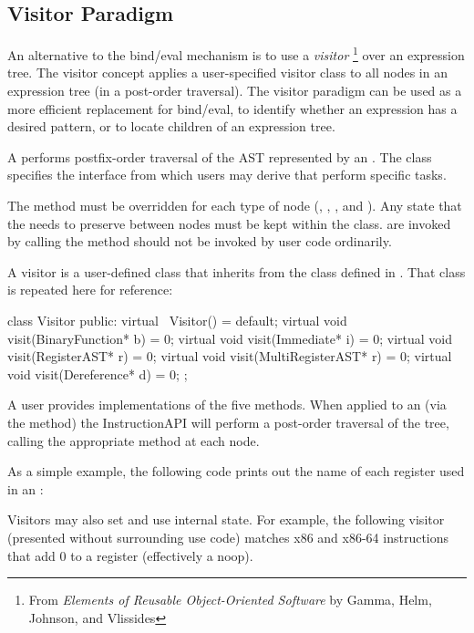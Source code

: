 \subsection{Visitor Paradigm}
\label{sec:visitor}


An alternative to the bind/eval mechanism is to use a \emph{visitor}
\footnote{From \emph{Elements of Reusable Object-Oriented Software} by
  Gamma, Helm, Johnson, and Vlissides}
over an expression tree. The visitor concept applies a user-specified
visitor class to all nodes in an expression tree (in a post-order
traversal). The visitor paradigm can be used as a more efficient
replacement for bind/eval, to identify whether an expression has a
desired pattern, or to locate children of an expression tree.

A  performs postfix-order traversal of the AST represented by
an .  The  class specifies the interface from which
users may derive  that perform specific tasks.

The  method must be overridden for each type of  node
(, , , and ).  Any state that
the  needs to preserve between nodes must be kept within the class.
 are invoked by calling  the  method
should not be invoked by user code ordinarily.

A visitor is a user-defined class that inherits from the
 class defined in . That class is
repeated here for reference:

\begin{apient}
class Visitor {
  public:
    virtual ~Visitor() = default;
    virtual void visit(BinaryFunction* b) = 0;
    virtual void visit(Immediate* i) = 0;
    virtual void visit(RegisterAST* r) = 0;
    virtual void visit(MultiRegisterAST* r) = 0;
    virtual void visit(Dereference* d) = 0;
};
\end{apient}

A user provides implementations of the five  methods. When
applied to an  (via the 
method) the InstructionAPI will perform a post-order traversal of the
tree, calling the appropriate  method at each node.

As a simple example, the following code prints out the name of each
register used in an :



Visitors may also set and use internal state. For example, the
following visitor (presented without surrounding use code) matches x86
and x86-64 instructions that add 0 to a register (effectively a
noop).


